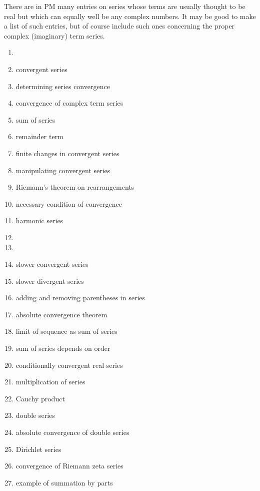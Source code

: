 \documentclass[12pt]{article}
\theoremstyle{definition}
\begin{document}
 

There are in PM many entries on series whose terms are usually thought to be real but which can equally well be any complex numbers.  It may be good to make a list of such entries, but of course include such ones concerning the proper complex (imaginary) term series.

\begin{multicols}{2}
\begin{enumerate}
\item {}
\item convergent series
\item determining series convergence
\item convergence of complex term series
\item sum of series
\item remainder term
\item finite changes in convergent series
\item manipulating convergent series
\item Riemann's theorem on rearrangements
\item necessary condition of convergence
\item harmonic series
\item {}
\item {}
\item slower convergent series
\item slower divergent series
\item adding and removing parentheses in series
\item absolute convergence theorem
\item limit of sequence as sum of series
\item sum of series depends on order
\item conditionally convergent real series
\item multiplication of series
\item Cauchy product
\item double series
\item absolute convergence of double series
\item Dirichlet series
\item convergence of Riemann zeta series
\item example of summation by parts

\end{enumerate}
\end{multicols}
\end{document}
